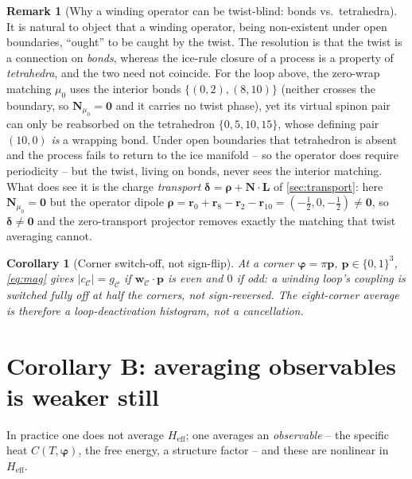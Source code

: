 \documentclass[11pt,letterpaper]{article}
\newcommand{\bvarphi}{\bm{\varphi}}
\newcommand{\bw}{\mathbf{w}}
\newcommand{\bN}{\mathbf{N}}
\newcommand{\br}{\mathbf{r}}
\newcommand{\bL}{\mathbf{L}}
\newcommand{\brho}{\bm{\rho}}
\newcommand{\bdelta}{\bm{\delta}}
\newcommand{\Heff}{H_{\mathrm{eff}}}
\theoremstyle{plain}
\newtheorem{corollary}{Corollary}
\theoremstyle{definition}
\newtheorem{remark}{Remark}
\begin{document}
\begin{remark}[Why a winding operator can be twist-blind: bonds vs.\
tetrahedra]
\label{rem:bondtet}
It is natural to object that a winding operator, being non-existent under
open boundaries, ``ought'' to be caught by the twist. The resolution is
that the twist is a connection on \emph{bonds}, whereas the ice-rule
closure of a process is a property of \emph{tetrahedra}, and the two need
not coincide. For the loop above, the zero-wrap matching $\mu_0$ uses the
interior bonds $\{(0,2),(8,10)\}$ (neither crosses the boundary, so
$\bN_{\mu_0}=\bm0$ and it carries no twist phase), yet its virtual spinon
pair can only be reabsorbed on the tetrahedron $\{0,5,10,15\}$, whose
defining pair $(10,0)$ \emph{is} a wrapping bond. Under open boundaries
that tetrahedron is absent and the process fails to return to the ice
manifold -- so the operator does require periodicity -- but the twist,
living on bonds, never sees the interior matching. What does see it is
the charge \emph{transport} $\bdelta=\brho+\bN\cdot\bL$ of
\cref{sec:transport}: here $\bN_{\mu_0}=\bm0$ but the operator dipole
$\brho=\br_0+\br_8-\br_2-\br_{10}=(-\tfrac12,0,-\tfrac12)\neq\bm0$, so
$\bdelta\neq\bm0$ and the zero-transport projector removes exactly the
matching that twist averaging cannot.
\end{remark}

\begin{corollary}[Corner switch-off, not sign-flip]
\label{cor:corner}
At a corner $\bvarphi=\pi\mathbf p$, $\mathbf p\in\{0,1\}^3$,
\eqref{eq:mag} gives $|c_{\mathcal C}|=g_{\mathcal C}$ if
$\bw_{\mathcal C}\cdot\mathbf p$ is even and $0$ if odd: a winding loop's
coupling is switched fully \emph{off} at half the corners, not
sign-reversed. The eight-corner average is therefore a
loop-deactivation histogram, not a cancellation.
\end{corollary}

\section{Corollary B: averaging observables is weaker still}
\label{sec:cor-obs}

In practice one does not average $\Heff$; one averages an
\emph{observable} -- the specific heat $C(T,\bvarphi)$, the free energy,
a structure factor -- and these are nonlinear in $\Heff$.
\end{document}
